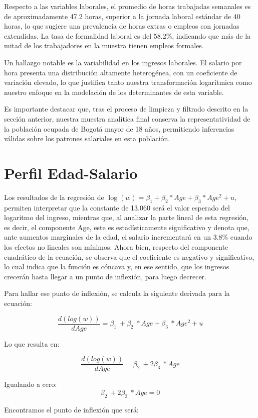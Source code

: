 \documentclass[12pt,a4paper,onecolumn]{article}
\begin{document}
Respecto a las variables laborales, el promedio de horas trabajadas semanales es de aproximadamente 47.2 horas, superior a la jornada laboral estándar de 40 horas, lo que sugiere una prevalencia de horas extras o empleos con jornadas extendidas. La tasa de formalidad laboral es del 58.2\%, indicando que más de la mitad de los trabajadores en la muestra tienen empleos formales.

Un hallazgo notable es la variabilidad en los ingresos laborales. El salario por hora presenta una distribución altamente heterogénea, con un coeficiente de variación elevado, lo que justifica tanto nuestra transformación logarítmica como nuestro enfoque en la modelación de los determinantes de esta variable.

Es importante destacar que, tras el proceso de limpieza y filtrado descrito en la sección anterior, nuestra muestra analítica final conserva la representatividad de la población ocupada de Bogotá mayor de 18 años, permitiendo inferencias válidas sobre los patrones salariales en esta población.

\section{Perfil Edad-Salario}

Los resultados de la regresión de $\log(w) = \beta_1 + \beta_2 * Age + \beta_3 * Age^2 + u$, permiten interpretar que la constante de 13.060 será el valor esperado del logaritmo del ingreso, mientras que, al analizar la parte lineal de esta regresión, es decir, el componente Age, este es estadísticamente significativo y denota que, ante aumentos marginales de la edad, el salario incrementará en un 3.8\% cuando los efectos no lineales son mínimos. Ahora bien, respecto del componente cuadrático de la ecuación, se observa que el coeficiente es negativo y significativo, lo cual indica que la función es cóncava y, en ese sentido, que los ingresos crecerán hasta llegar a un punto de inflexión, para luego decrecer.

Para hallar ese punto de inflexión, se calcula la siguiente derivada para la ecuación:

$$\frac{d(log(w))}{dAge} = \beta_1\ + \beta_2\ * Age + \beta_3\ * Age^2 + u$$

Lo que resulta en:

$$\frac{d(log(w))}{dAge} = \beta_2\ + 2\beta_3\ *Age$$

Igualando a cero:
$$ \beta_2\ + 2\beta_3\ * Age=0$$

Encontramos el punto de inflexión que será:
\end{document}
